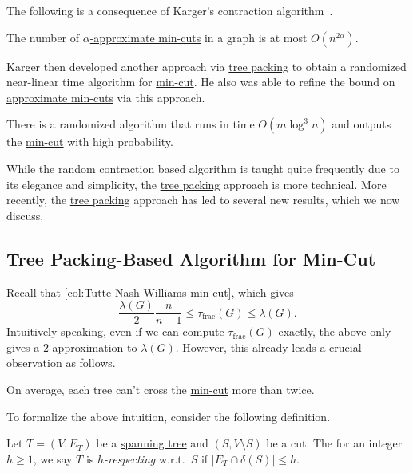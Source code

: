 The following is a consequence of Karger's contraction algorithm~\cite{karger1995random}.

\begin{theorem}\label{thm:number-approximate-min-cut}
	The number of \hyperref[def:approximate-min-cut]{\(\alpha \)-approximate min-cuts} in a graph is at most \(O(n^{2 \alpha })\).
\end{theorem}

Karger then developed another approach via \hyperref[prb:TP]{tree packing} to obtain a randomized near-linear time algorithm for \hyperref[prb:global-min-cut]{min-cut}. He also was able to refine the bound on \hyperref[thm:number-approximate-min-cut]{approximate min-cuts} via this approach.

\begin{theorem}\label{thm:Karger-tree-packing-based-min-cut}
	There is a randomized algorithm that runs in time \(O(m \log ^3 n)\) and outputs the \hyperref[prb:global-min-cut]{min-cut} with high probability.
\end{theorem}

While the random contraction based algorithm is taught quite frequently due to its elegance and simplicity, the \hyperref[prb:TP]{tree packing} approach is more technical. More recently, the \hyperref[prb:TP]{tree packing} approach has led to several new results, which we now discuss.

\subsection{Tree Packing-Based Algorithm for Min-Cut}
Recall that \autoref{col:Tutte-Nash-Williams-min-cut}, which gives
\[
	\frac{\lambda (G)}{2} \frac{n}{n-1}
	\leq \tau _{\text{frac} }(G)
	\leq \lambda (G).
\]
Intuitively speaking, even if we can compute \(\tau _{\text{frac} }(G)\) exactly, the above only gives a \(2\)-approximation to \(\lambda (G)\). However, this already leads a crucial observation as follows.

\begin{intuition}
	On average, each tree can't cross the \hyperref[prb:global-min-cut]{min-cut} more than twice.
\end{intuition}

To formalize the above intuition, consider the following definition.

\begin{definition}[Respecting]\label{def:respect}
	Let \(T = (V, E_T)\) be a \hyperref[def:spanning-tree]{spanning tree} and \((S, V\setminus S)\) be a cut. The for an integer \(h \geq 1\), we say \(T\) is \emph{\(h\)-respecting} w.r.t.\ \(S\) if \(\lvert E_T \cap \delta (S) \rvert \leq h\).
\end{definition}

